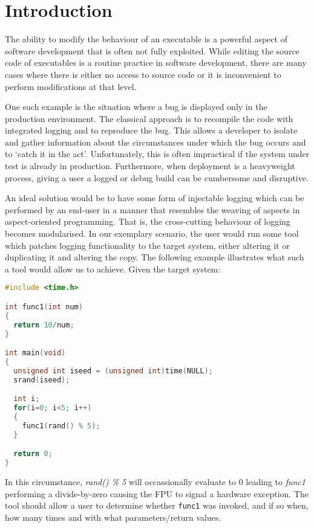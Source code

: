 \section{Introduction}

The ability to modify the behaviour of an executable is a powerful aspect of software development that is often not fully exploited. While editing the source code of executables is a routine practice in software development, there are many cases where there is either no access to source code or it is inconvenient to perform modifications at that level.

One such example is the situation where a bug is displayed only in the production environment. The classical approach is to recompile the code with integrated logging and to reproduce the bug. This allows a developer to isolate and gather information about the circumstances under which the bug occurs and to `catch it in the act'. Unfortunately, this is often impractical if the system under test is already in production. Furthermore, when deployment is a heavyweight process, giving a user a logged or debug build can be cumbersome and disruptive.

An ideal solution would be to have some form of injectable logging which can be performed by an end-user in a manner that resembles the weaving of aspects in aspect-oriented programming. That is, the cross-cutting behaviour of logging becomes modularised. In our exemplary scenario, the user would run some tool which patches logging functionality to the target system, either altering it or duplicating it and altering the copy. The following example illustrates what such a tool would allow us to achieve. Given the target system:

\begin{lstlisting}[language=C,caption={Target Process}]
#include <time.h>

int func1(int num)
{
  return 10/num;
}

int main(void)
{
  unsigned int iseed = (unsigned int)time(NULL);
  srand(iseed);

  int i;
  for(i=0; i<5; i++)
  {
    func1(rand() % 5);
  }

  return 0;
}
\end{lstlisting}

In this circumstance, \emph{rand() \% 5} will occassionally evaluate to 0 leading to \emph{func1} performing a divide-by-zero causing the FPU to signal a hardware exception. The tool should allow a user to determine whether \texttt{func1} was invoked, and if so when, how many times and with what parameters/return values.

